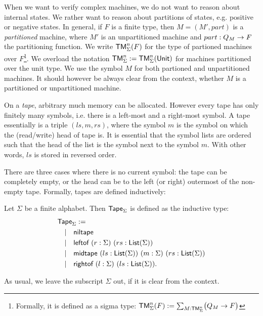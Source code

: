When we want to verify complex machines, we do not want to reason about internal states.  We rather want to reason about partitions of states,
e.g. positive or negative states.  In general, if $F$ is a finite type, then $M = (M', part)$ is a \emph{partitioned} machine, where $M'$ is an
unpartitioned machine and $part : Q_M \rightarrow F$ the partitioning function.  We write $\textsf{TM}_\Sigma^n(F)$ for the type of partioned machines over
$F$\footnote{Formally, it is defined as a sigma type: $\textsf{TM}_\Sigma^n(F) := \sum_{M:\textsf{TM}_\Sigma^n}\bigl(Q_M \rightarrow F\bigr)$}.  We overload the
notation $\textsf{TM}_\Sigma^n := \textsf{TM}_\Sigma^n(\textsf{Unit})$ for machines partitioned over the unit type.  We use the symbol $M$ for both partioned and
unpartitioned machines.  It should however be always clear from the context, whether $M$ is a partitioned or unpartitioned machine.

On a \emph{tape}, arbitrary much memory can be allocated.  However every tape has only finitely many symbols, i.e. there is a left-most and a
right-most symbol.  A tape essentially is a triple $(ls,m,rs)$, where the symbol $m$ is the symbol on which the (read/write) head of tape is.  It is
essential that the symbol lists are ordered such that the head of the list is the symbol next to the symbol $m$.  With other words, $ls$ is stored in
reversed order.

There are three cases where there is no current symbol: the tape can be completely empty, or the head can be to the left (or right) outermost of the
non-empty tape.  Formally, tapes are defined inductively:

\begin{definition}[Tape]
  \label{def:tape}
  Let $\Sigma$ be a finite alphabet.  Then $\textsf{Tape}_\Sigma$ is defined as the inductive type:
  \begin{align*}
    & \textsf{Tape}_\Sigma := \\
    & \quad | \quad \textsf{niltape} \\
    & \quad | \quad \textsf{leftof}  ~ (r:\Sigma) ~ (rs:\textsf{List}(\Sigma)) \\
    & \quad | \quad \textsf{midtape} ~ (ls:\textsf{List}(\Sigma)) ~ (m:\Sigma) ~ (rs:\textsf{List}(\Sigma)) \\
    & \quad | \quad \textsf{rightof} ~ (l:\Sigma) ~ (ls:\textsf{List}(\Sigma)).
  \end{align*}
\end{definition}

As usual, we leave the subscript $\Sigma$ out, if it is clear from the context.

